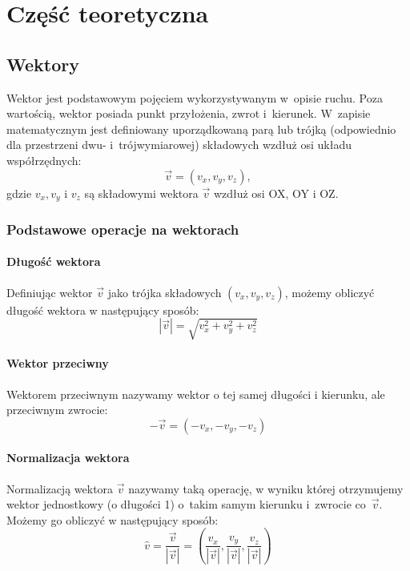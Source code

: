 \chapter{Część teoretyczna}

\section{Wektory}
\label{part:wektory}
Wektor jest podstawowym pojęciem wykorzystywanym w~opisie ruchu. Poza wartością, wektor posiada punkt przyłożenia, zwrot i~kierunek. W~zapisie matematycznym jest definiowany uporządkowaną parą lub trójką (odpowiednio dla przestrzeni dwu- i~trójwymiarowej) składowych wzdłuż osi układu współrzędnych: 
\[
\vec{v} = (v_x, v_y, v_z),
\]
gdzie $v_x, v_y$ i $v_z$ są składowymi wektora $\vec{v}$ wzdłuż osi OX, OY i OZ. \newline

\subsection{Podstawowe operacje na wektorach}
\subsubsection{Długość wektora}
Definiując wektor $\vec{v}$ jako trójka składowych $(v_x, v_y, v_z)$, możemy obliczyć długość wektora w następujący sposób:
\begin{equation}
|\vec{v}| = \sqrt{v_x^2 + v_y^2 +v_z^2}
\end{equation}

\subsubsection{Wektor przeciwny}
Wektorem przeciwnym nazywamy wektor o tej samej długości i kierunku, ale przeciwnym zwrocie:
\begin{equation}
-\vec{v} = (-v_x, -v_y, -v_z)
\end{equation}
\subsubsection{Normalizacja wektora}
Normalizacją wektora $\vec{v}$ nazywamy taką operację, w wyniku której otrzymujemy wektor jednostkowy (o długości 1) o~takim samym kierunku i~zwrocie co~$\vec{v}$. Możemy go obliczyć w następujący sposób:
\begin{equation}
\hat{v} = \frac{\vec{v}}{ {|\vec{v}|}} = (\frac{v_x} {|\vec{v}|}, \frac{v_y}{|\vec{v}|}, \frac{v_z}{|\vec{v}|})
\end{equation}
